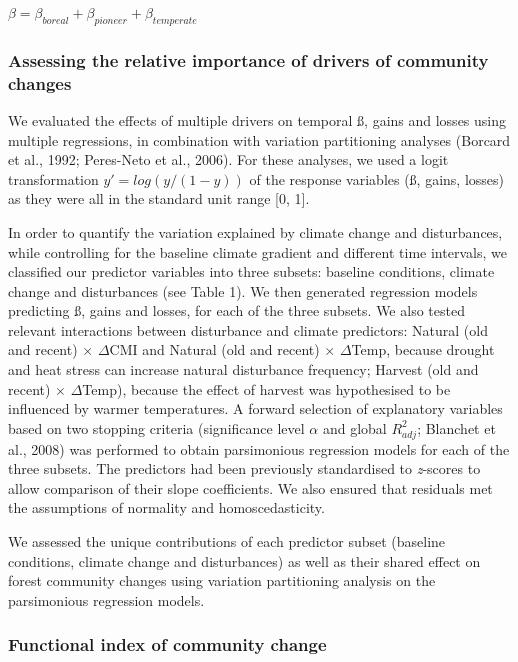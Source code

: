\documentclass[
  a4paperpaper,
]{article}
\begin{document}
\(\beta = \beta_{boreal} + \beta_{pioneer} + \beta_{temperate}\)

\hypertarget{assessing-the-relative-importance-of-drivers-of-community-changes}{%
\subsubsection{Assessing the relative importance of drivers of community
changes}\label{assessing-the-relative-importance-of-drivers-of-community-changes}}

We evaluated the effects of multiple drivers on temporal ß, gains and
losses using multiple regressions, in combination with variation
partitioning analyses (Borcard et al., 1992; Peres-Neto et al., 2006).
For these analyses, we used a logit transformation \(y'=log(y/(1-y))\)
of the response variables (ß, gains, losses) as they were all in the
standard unit range {[}0, 1{]}.

In order to quantify the variation explained by climate change and
disturbances, while controlling for the baseline climate gradient and
different time intervals, we classified our predictor variables into
three subsets: baseline conditions, climate change and disturbances (see
Table 1). We then generated regression models predicting ß, gains and
losses, for each of the three subsets. We also tested relevant
interactions between disturbance and climate predictors: Natural (old
and recent) \(\times\) \(\Delta\)CMI and Natural (old and recent)
\(\times\) \(\Delta\)Temp, because drought and heat stress can increase
natural disturbance frequency; Harvest (old and recent) \(\times\)
\(\Delta\)Temp), because the effect of harvest was hypothesised to be
influenced by warmer temperatures. A forward selection of explanatory
variables based on two stopping criteria (significance level \(\alpha\)
and global \(R^2_{adj}\); Blanchet et al., 2008) was performed to obtain
parsimonious regression models for each of the three subsets. The
predictors had been previously standardised to \emph{z}-scores to allow
comparison of their slope coefficients. We also ensured that residuals
met the assumptions of normality and homoscedasticity.

We assessed the unique contributions of each predictor subset (baseline
conditions, climate change and disturbances) as well as their shared
effect on forest community changes using variation partitioning analysis
on the parsimonious regression models.

\hypertarget{functional-index-of-community-change}{%
\subsubsection{Functional index of community
change}\label{functional-index-of-community-change}}
\end{document}
